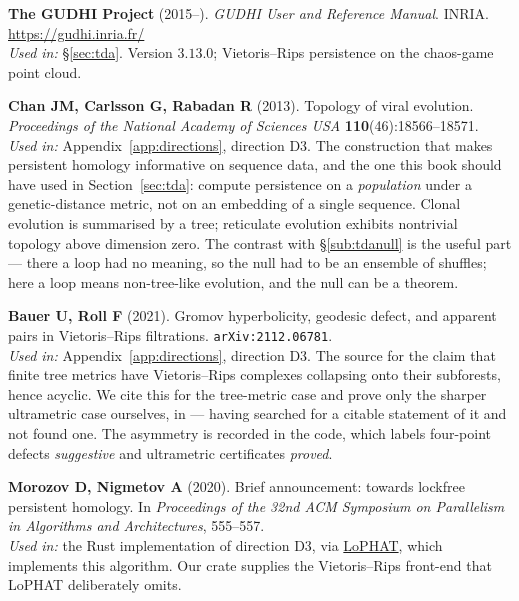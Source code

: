 \begin{refs}
\item \textbf{The GUDHI Project} (2015--). \emph{GUDHI User and Reference Manual}.
INRIA. \url{https://gudhi.inria.fr/}
\\[0.15em]
\emph{Used in:} §\ref{sec:tda}. Version $3.13.0$; Vietoris--Rips persistence on
the chaos-game point cloud.

\item \textbf{Chan JM, Carlsson G, Rabadan R} (2013). Topology of viral
evolution. \emph{Proceedings of the National Academy of Sciences USA}
\textbf{110}(46):18566--18571. 
\\[0.15em]
\emph{Used in:} Appendix~\ref{app:directions}, direction D3. The construction
that makes persistent homology informative on sequence data, and the one this
book should have used in Section~\ref{sec:tda}: compute persistence on a
\emph{population} under a genetic-distance metric, not on an embedding of a
single sequence. Clonal evolution is summarised by a tree; reticulate evolution
exhibits nontrivial topology above dimension zero. The contrast with
\S\ref{sub:tdanull} is the useful part --- there a loop had no meaning, so the
null had to be an ensemble of shuffles; here a loop means non-tree-like
evolution, and the null can be a theorem.

\item \textbf{Bauer U, Roll F} (2021). Gromov hyperbolicity, geodesic defect,
and apparent pairs in Vietoris--Rips filtrations. \texttt{arXiv:2112.06781}.
\nodoi
\\[0.15em]
\emph{Used in:} Appendix~\ref{app:directions}, direction D3. The source for the
claim that finite tree metrics have Vietoris--Rips complexes collapsing onto
their subforests, hence acyclic. We cite this for the tree-metric case and
prove only the sharper ultrametric case ourselves, in
 --- having searched for a
citable statement of it and not found one. The asymmetry is recorded in the code,
which labels four-point defects \emph{suggestive} and ultrametric certificates
\emph{proved}.

\item \textbf{Morozov D, Nigmetov A} (2020). Brief announcement: towards
lockfree persistent homology. In \emph{Proceedings of the 32nd ACM Symposium on
Parallelism in Algorithms and Architectures}, 555--557.
\\[0.15em]
\emph{Used in:} the Rust implementation of direction D3, via
\href{https://github.com/tomchaplin/lophat}{LoPHAT}, which implements this
algorithm. Our crate supplies the Vietoris--Rips front-end that LoPHAT
deliberately omits.


\end{refs}
